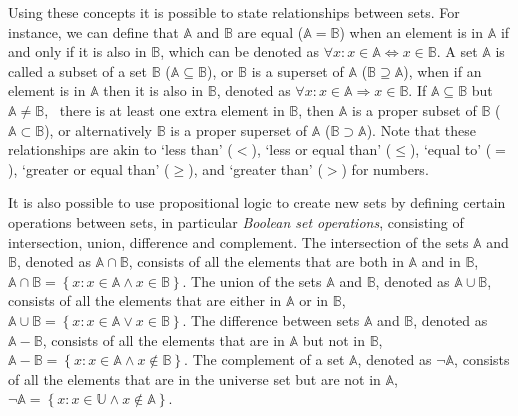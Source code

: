 Using these concepts it is possible to state relationships between sets.
For instance, we can define that \(\mathbb{A}\) and \(\mathbb{B}\) are equal (\(\mathbb{A} = \mathbb{B}\)) when an element is in \(\mathbb{A}\) if and only if it is also in \(\mathbb{B}\), which can be denoted as \(\forall x : x \in \mathbb{A} \Leftrightarrow x \in \mathbb{B}\).
A set \(\mathbb{A}\) is called a subset of a set \(\mathbb{B}\) (\(\mathbb{A} \subseteq \mathbb{B}\)), or \(\mathbb{B}\) is a superset of \(\mathbb{A}\) (\(\mathbb{B} \supseteq \mathbb{A}\)), when if an element is in \(\mathbb{A}\) then it is also in \(\mathbb{B}\), denoted as \(\forall x : x \in \mathbb{A} \Rightarrow x \in \mathbb{B}\).
If \(\mathbb{A} \subseteq \mathbb{B}\) but \(\mathbb{A} \neq \mathbb{B}\), \ie\ there is at least one extra element in \(\mathbb{B}\), then \(\mathbb{A}\) is a proper subset of \(\mathbb{B}\) (\(\mathbb{A} \subset \mathbb{B}\)), or alternatively \(\mathbb{B}\) is a proper superset of \(\mathbb{A}\) (\(\mathbb{B} \supset \mathbb{A}\)).
Note that these relationships are akin to `less than' (\(<\)), `less or equal than' (\(\leq\)), `equal to' (\(=\)), `greater or equal than' (\(\geq\)), and `greater than' (\(>\)) for numbers.

It is also possible to use propositional logic to create new sets by defining certain operations between sets, in particular \emph{Boolean set operations}, consisting of intersection, union, difference and complement.
The intersection of the sets \(\mathbb{A}\) and \(\mathbb{B}\), denoted as \(\mathbb{A} \cap \mathbb{B}\), consists of all the elements that are both in \(\mathbb{A}\) and in \(\mathbb{B}\), \ie\ \(\mathbb{A} \cap \mathbb{B} = \left\{ x : x \in \mathbb{A} \wedge x \in \mathbb{B} \right\}\).
The union of the sets \(\mathbb{A}\) and \(\mathbb{B}\), denoted as \(\mathbb{A} \cup \mathbb{B}\), consists of all the elements that are either in \(\mathbb{A}\) or in \(\mathbb{B}\), \ie\ \(\mathbb{A} \cup \mathbb{B} = \left\{ x : x \in \mathbb{A} \vee x \in \mathbb{B} \right\}\).
The difference between sets \(\mathbb{A}\) and \(\mathbb{B}\), denoted as \(\mathbb{A} - \mathbb{B}\), consists of all the elements that are in \(\mathbb{A}\) but not in \(\mathbb{B}\), \ie\ \(\mathbb{A} - \mathbb{B} = \left\{ x : x \in \mathbb{A} \wedge x \notin \mathbb{B} \right\}\).
The complement of a set \(\mathbb{A}\), denoted as \(\neg \mathbb{A}\), consists of all the elements that are in the universe set but are not in \(\mathbb{A}\), \ie\ \(\neg \mathbb{A} = \left\{ x : x \in \mathbb{U} \wedge x \notin \mathbb{A} \right\}\).

